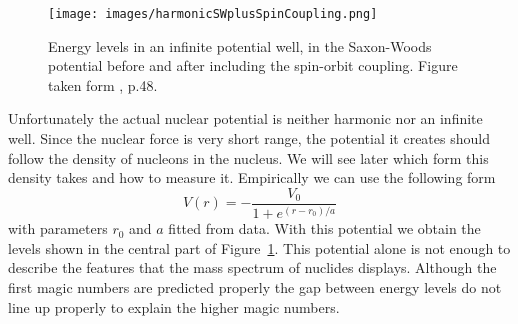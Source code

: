 \documentclass[12pt]{article}
\begin{document}
\begin{figure}
\begin{center}
\texttt{[image: images/harmonicSWplusSpinCoupling.png]}
\caption{Energy levels in an infinite potential well, in the Saxon-Woods potential before and after including the spin-orbit coupling. Figure taken form \cite{Lilley:2009zz}, p.48.}\label{fig:levels}
\end{center}
\end{figure}

Unfortunately the actual nuclear potential is neither harmonic nor an infinite well. Since the nuclear force is very short range, the potential it creates should follow the density of nucleons in the nucleus. We will see later which form this density takes and how to measure it. Empirically we can use the following form 
\[V(r)=-\frac{V_0}{1+e^{(r-r_0)/a}}\]
with parameters $r_0$ and $a$ fitted from data. With this potential we obtain the levels shown in the central part of Figure~\ref{fig:levels}. This potential alone is not enough to describe the features that the mass spectrum of nuclides displays. Although the first magic numbers are predicted properly the gap between energy levels do not line up properly to explain the higher magic numbers.
\end{document}
